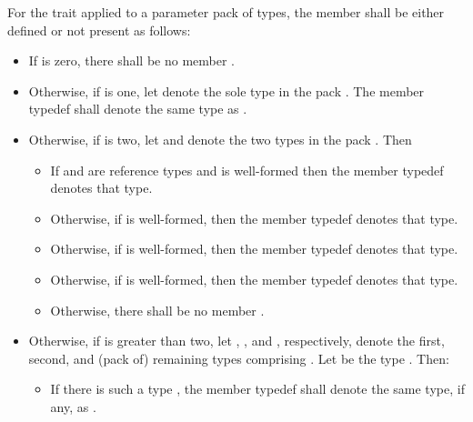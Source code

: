 
\begin{addedblock}
\pnum
For the  trait applied to a parameter pack  of
types, the member  shall be either defined or not present as follows:
\begin{itemize}
\item If  is zero, there shall be no member .

\item Otherwise, if  is one, let  denote the sole
  type in the pack . The member typedef  shall denote the
  same type as .

\item Otherwise, if  is two, let  and 
  denote the two types in the pack . Then
  \begin{itemize}
  \item If  and  are reference types and
     is well-formed 
    then the member typedef  denotes that type.

  \item Otherwise, if  is well-formed, then the member typedef
     denotes that type.

  \item Otherwise, if  is well-formed, then the
    member typedef  denotes that type.

  \item Otherwise, if  is well-formed, then the
    member typedef  denotes that type.

  \item Otherwise, there shall be no member .
  \end{itemize}

\item Otherwise, if  is greater than two, let ,
  , and , respectively, denote the first, second, and
  (pack of) remaining types comprising . Let  be the type
  . Then:
  \begin{itemize}
  \item If there is such a type , the member typedef  shall
    denote the same type, if any, as .


\end{itemize}
\end{itemize}
\end{addedblock}

